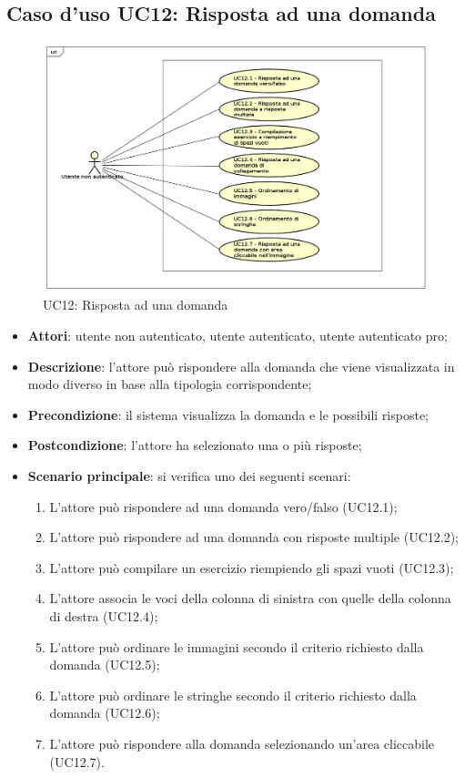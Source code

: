 \newpage
\subsection{Caso d'uso UC12: Risposta ad una domanda}
\label{UC12}
\begin{figure}[ht]
	\centering
	\includegraphics[scale=0.5]{UML/UC12.png}
	\caption{UC12: Risposta ad una domanda}
\end{figure}
\FloatBarrier
\begin{itemize}
\item \textbf{Attori}: utente non autenticato, utente autenticato, utente autenticato pro;
\item \textbf{Descrizione}: l'attore può rispondere alla domanda che viene visualizzata in modo diverso in base alla tipologia corrispondente;
\item \textbf{Precondizione}: il sistema visualizza la domanda e le possibili risposte;
\item \textbf{Postcondizione}: l'attore ha selezionato una o più risposte;
\item \textbf{Scenario principale}: si verifica uno dei seguenti scenari:
\begin{enumerate}
	\item L'attore può rispondere ad una domanda vero/falso (UC12.1);
	\item L'attore può rispondere ad una domanda con risposte multiple (UC12.2);
	\item L'attore può compilare un esercizio riempiendo gli spazi vuoti (UC12.3);
	\item L'attore associa le voci della colonna di sinistra con quelle della colonna di destra (UC12.4);
	\item L'attore può ordinare le immagini secondo il criterio richiesto dalla domanda (UC12.5);
	\item L'attore può ordinare le stringhe secondo il criterio richiesto dalla domanda (UC12.6);
	\item L'attore può rispondere alla domanda selezionando un'area cliccabile (UC12.7). 
\end{enumerate}
\end{itemize}

